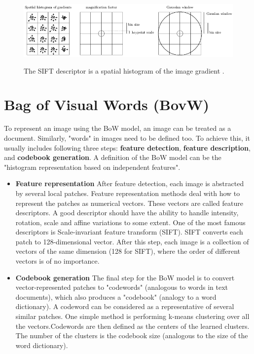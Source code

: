 \documentclass[12pt]{article}
\numberwithin{equation}{section}
\numberwithin{table}{section}
\numberwithin{figure}{section}
\begin{document}
\begin{figure}[H] \centering
	\caption{The SIFT descriptor is a spatial histogram of the image gradient \cite{sift}. }
	\includegraphics[width=1\textwidth]{image6.png}
	\label{figure6}
\end{figure}



\section{Bag of Visual Words (BovW)} \label{bow}

To represent an image using the BoW model, an image can be treated as a document. Similarly, "words" in images need to be defined too. To achieve this, it usually includes following three steps: \textbf{feature detection}, \textbf{feature description}, and \textbf{codebook generation}. A definition of the BoW model can be the "histogram representation based on independent features".

\begin{itemize}

\item \textbf{Feature representation} After feature detection, each image is abstracted by several local patches. Feature representation methods deal with how to represent the patches as numerical vectors. These vectors are called feature descriptors. A good descriptor should have the ability to handle intensity, rotation, scale and affine variations to some extent. One of the most famous descriptors is Scale-invariant feature transform (SIFT). SIFT converts each patch to 128-dimensional vector. After this step, each image is a collection of vectors of the same dimension (128 for SIFT), where the order of different vectors is of no importance.

\item \textbf{Codebook generation} The final step for the BoW model is to convert vector-represented patches to "codewords" (analogous to words in text documents), which also produces a "codebook" (analogy to a word dictionary). A codeword can be considered as a representative of several similar patches. One simple method is performing k-means clustering over all the vectors.Codewords are then defined as the centers of the learned clusters. The number of the clusters is the codebook size (analogous to the size of the word dictionary).

\end{itemize}
\end{document}
